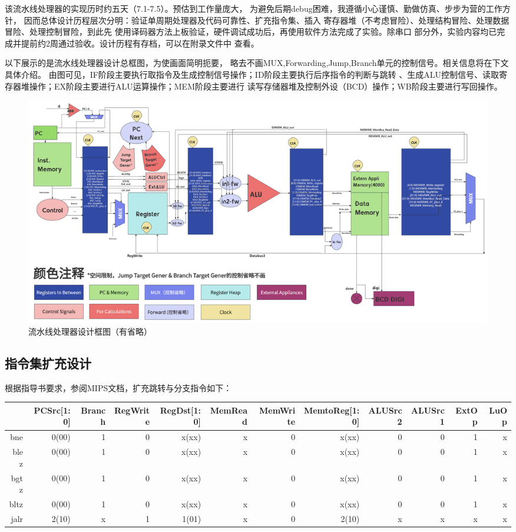 \documentclass[10pt]{article}
\begin{document}
该流水线处理器的实现历时约五天（7.1-7.5）。预估到工作量庞大，
为避免后期debug困难，我遵循小心谨慎、勤做仿真、步步为营的工作方针，
因而总体设计历程层次分明：验证单周期处理器及代码可靠性、扩充指令集、插入
寄存器堆（不考虑冒险）、处理结构冒险、处理数据冒险、处理控制冒险，到此先
使用译码器方法上板验证，硬件调试成功后，再使用软件方法完成了实验。除串口
部分外，实验内容均已完成并提前约2周通过验收。设计历程有存档，可以在附录文件中
查看。

以下展示的是流水线处理器设计总框图，为使画面简明扼要，
略去不画MUX,Forwarding,Jump,Branch单元的控制信号。相关信息将在下文具体介绍。
由图可见，IF阶段主要执行取指令及生成控制信号操作；ID阶段主要执行后序指令的判断与跳转
、生成ALU控制信号、读取寄存器堆操作；EX阶段主要进行ALU运算操作；MEM阶段主要进行
读写存储器堆及控制外设（BCD）操作；WB阶段主要进行写回操作。
\begin{figure}[H]
    \centering
    \includegraphics[scale=0.163]{panor.png}
    \caption{流水线处理器设计框图（有省略）}
    \end{figure}
\subsection{指令集扩充设计}
根据指导书要求，参阅MIPS文档，扩充跳转与分支指令如下：
\begin{table}[h]
    \footnotesize
\begin{center}
    \begin{tabular}{|r|r|r|r|r|r|r|r|r|r|r|r|}
        \hline
        &PCSrc[1:0]& Branch & RegWrite & RegDst[1:0] & MemRead & MemWrite & MemtoReg[1:0] & ALUSrc2 & ALUSrc1 & ExtOp & LuOp\\
        \hline
        bne & 0(00) & 1 & 0 & x(xx) & x & 0 & x(xx) & 0 & 0 & 1 & x\\
        \hline
        blez& 0(00) & 1 & 0 & x(xx) & x & 0 & x(xx) & 0 & 0 & 1 & x\\
        \hline
        bgtz& 0(00) & 1 & 0 & x(xx) & x & 0 & x(xx) & 0 & 0 & 1 & x\\
        \hline
        bltz& 0(00) & 1 & 0 & x(xx) & x & 0 & x(xx) & 0 & 0 & 1 & x\\
        \hline
        jalr& 2(10) & x & 1 & 1(01) & x & 0 & 2(10) & x & x & x & x\\
        \hline
    \end{tabular}
\end{center}
\end{table}
\end{document}
